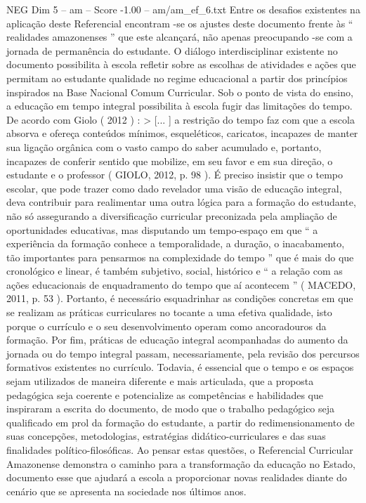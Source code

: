\begin{textsample}{NEG Dim 5 – am – Score -1.00 – am/am\_ef\_6.txt}
Entre os desafios existentes na aplicação deste Referencial encontram -se os ajustes deste documento frente às “ realidades amazonenses ” que este alcançará, não apenas preocupando -se com a jornada de permanência do estudante.
O diálogo interdisciplinar existente no documento possibilita à escola refletir sobre as escolhas de atividades e ações que permitam ao estudante qualidade no regime educacional a partir dos princípios inspirados na Base Nacional Comum Curricular.
Sob o ponto de vista do ensino, a educação em tempo integral possibilita à escola fugir das limitações do tempo.
De acordo com Giolo ( 2012 ) : > [... ] a restrição do tempo faz com que a escola absorva e ofereça conteúdos mínimos, esqueléticos, caricatos, incapazes de manter sua ligação orgânica com o vasto campo do saber acumulado e, portanto, incapazes de conferir sentido que mobilize, em seu favor e em sua direção, o estudante e o professor ( GIOLO, 2012, p. 98 ).
É preciso insistir que o tempo escolar, que pode trazer como dado revelador uma visão de educação integral, deva contribuir para realimentar uma outra lógica para a formação do estudante, não só assegurando a diversificação curricular preconizada pela ampliação de oportunidades educativas, mas disputando um tempo-espaço em que “ a experiência da formação conhece a temporalidade, a duração, o inacabamento, tão importantes para pensarmos na complexidade do tempo ” que é mais do que cronológico e linear, é também subjetivo, social, histórico e “ a relação com as ações educacionais de enquadramento do tempo que aí acontecem ” ( MACEDO, 2011, p. 53 ).
Portanto, é necessário esquadrinhar as condições concretas em que se realizam as práticas curriculares no tocante a uma efetiva qualidade, isto porque o currículo e o seu desenvolvimento operam como ancoradouros da formação.
Por fim, práticas de educação integral acompanhadas do aumento da jornada ou do tempo integral passam, necessariamente, pela revisão dos percursos formativos existentes no currículo.
Todavia, é essencial que o tempo e os espaços sejam utilizados de maneira diferente e mais articulada, que a proposta pedagógica seja coerente e potencialize as competências e habilidades que inspiraram a escrita do documento, de modo que o trabalho pedagógico seja qualificado em prol da formação do estudante, a partir do redimensionamento de suas concepções, metodologias, estratégias didático-curriculares e das suas finalidades político-filosóficas.
Ao pensar estas questões, o Referencial Curricular Amazonense demonstra o caminho para a transformação da educação no Estado, documento esse que ajudará a escola a proporcionar novas realidades diante do cenário que se apresenta na sociedade nos últimos anos.

\end{textsample}
